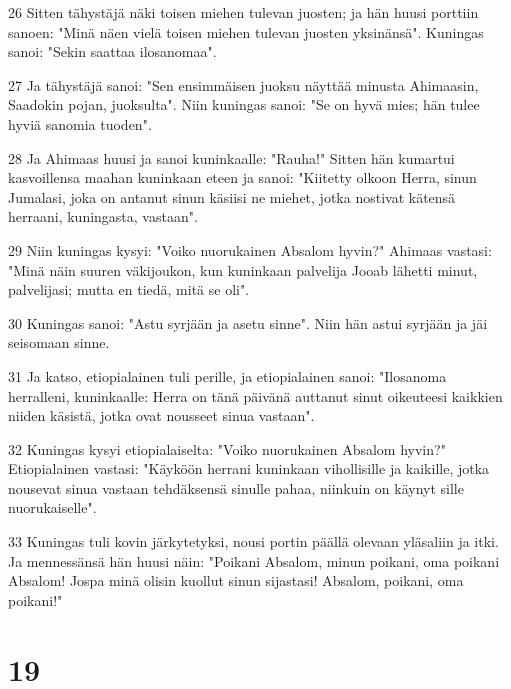 \par 26 Sitten tähystäjä näki toisen miehen tulevan juosten; ja hän huusi porttiin sanoen: "Minä näen vielä toisen miehen tulevan juosten yksinänsä". Kuningas sanoi: "Sekin saattaa ilosanomaa".
\par 27 Ja tähystäjä sanoi: "Sen ensimmäisen juoksu näyttää minusta Ahimaasin, Saadokin pojan, juoksulta". Niin kuningas sanoi: "Se on hyvä mies; hän tulee hyviä sanomia tuoden".
\par 28 Ja Ahimaas huusi ja sanoi kuninkaalle: "Rauha!" Sitten hän kumartui kasvoillensa maahan kuninkaan eteen ja sanoi: "Kiitetty olkoon Herra, sinun Jumalasi, joka on antanut sinun käsiisi ne miehet, jotka nostivat kätensä herraani, kuningasta, vastaan".
\par 29 Niin kuningas kysyi: "Voiko nuorukainen Absalom hyvin?" Ahimaas vastasi: "Minä näin suuren väkijoukon, kun kuninkaan palvelija Jooab lähetti minut, palvelijasi; mutta en tiedä, mitä se oli".
\par 30 Kuningas sanoi: "Astu syrjään ja asetu sinne". Niin hän astui syrjään ja jäi seisomaan sinne.
\par 31 Ja katso, etiopialainen tuli perille, ja etiopialainen sanoi: "Ilosanoma herralleni, kuninkaalle: Herra on tänä päivänä auttanut sinut oikeuteesi kaikkien niiden käsistä, jotka ovat nousseet sinua vastaan".
\par 32 Kuningas kysyi etiopialaiselta: "Voiko nuorukainen Absalom hyvin?" Etiopialainen vastasi: "Käyköön herrani kuninkaan vihollisille ja kaikille, jotka nousevat sinua vastaan tehdäksensä sinulle pahaa, niinkuin on käynyt sille nuorukaiselle".
\par 33 Kuningas tuli kovin järkytetyksi, nousi portin päällä olevaan yläsaliin ja itki. Ja mennessänsä hän huusi näin: "Poikani Absalom, minun poikani, oma poikani Absalom! Jospa minä olisin kuollut sinun sijastasi! Absalom, poikani, oma poikani!"

\chapter{19}

